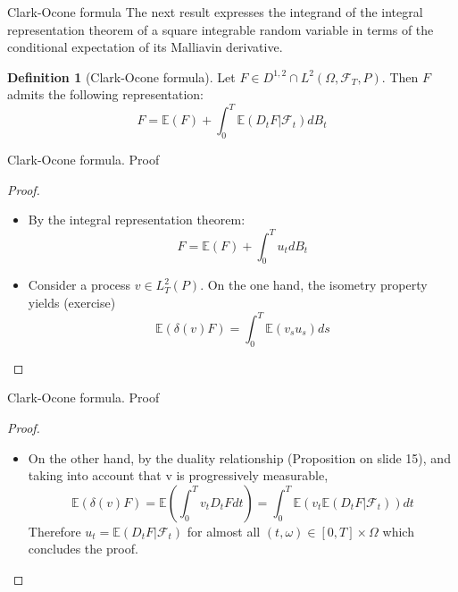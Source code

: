 \documentclass{beamer}%
\theoremstyle{definition}
\newtheorem{mydef}[theorem]{Definition}
\begin{document}
\begin{frame}{Clark-Ocone formula}
The next result expresses the integrand of the integral representation theorem of a square integrable random variable in terms of the conditional expectation of its Malliavin derivative.
\begin{mydef}[Clark-Ocone formula]
Let $F \in D^{1,2} \cap L^2 (\Omega, \mathcal{F}_T, P)$. Then $F$ admits the following representation:
$$
F = \mathbb{E} (F) + \int_{0}^{T} \mathbb{E} (D_tF | \mathcal{F}_t) dB_t
$$
\end{mydef}

\end{frame}
\begin{frame}{Clark-Ocone formula. Proof}

\begin{proof}
\\
\begin{itemize} 
\item By the integral representation theorem:
$$F = \mathbb{E}(F) + \int_{0}^{T} u_t dB_t $$
\item Consider a process $v \in L^2_{T}(P)$. On the one hand, the isometry property yields (exercise)
$$\mathbb{E}(\delta(v)F) = \int_{0}^{T} \mathbb{E}(v_s u_s) ds$$ 
\end{itemize}
\end{proof}

\end{frame}
\begin{frame}{Clark-Ocone formula. Proof}

\begin{proof}
\\
\begin{itemize} 
\item On the other hand, by the duality relationship (Proposition on slide 15), and taking into account that v is progressively measurable,
$$\mathbb{E}(\delta(v)F) = \mathbb{E}\left(\int_{0}^{T} v_tD_tFdt\right) = \int_{0}^{T} \mathbb{E}(v_t\mathbb{E}(D_tF|\mathcal{F}_t))dt$$
Therefore $u_t = \mathbb{E}(D_tF|\mathcal{F}_t)$ for almost all $(t, \omega) \in [0, T] \times \Omega$ which concludes the proof. 
\end{itemize}
\end{proof}

\end{frame}
\end{document}
